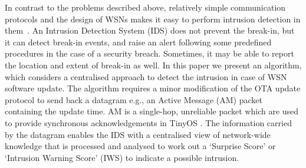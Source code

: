 \documentclass[conference]{IEEEtran}
\newcommand{\notedme}[1]{\raisebox{0pt}[0pt][0pt]{\pdfcomment[open=true,color=blue]{#1}}}
\begin{document}
In contrast to the problems described above, relatively simple communication protocols and the design of WSNs makes it easy to perform intrusion detection in them~\cite{quing09}.
An Intrusion Detection System (IDS) does not prevent the break-in, but it can detect  break-in events, and raise an alert following some predefined procedures in the case of a security breach.
Sometimes, it may be able to report the location and extent of break-in as well.
In this paper we present an algorithm, which considers a centralised approach to detect  the intrusion in case of WSN software update.
The algorithm requires a minor modification of the OTA update protocol to send back a datagram e.g., an Active Message (AM) packet containing the update time.
AM is a single-hop, unreliable packet which are used to provide synchronous acknowledgements in TinyOS \cite{tep116}. %
The information carried by the datagram enables the IDS with a centralised view of network-wide knowledge that is processed and analysed to work out a  `Surprise Score' or `Intrusion Warning Score' (IWS) to indicate a possible intrusion.
\end{document}

